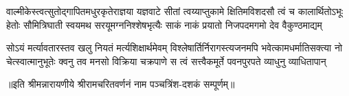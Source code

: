 \fourlineindentedshloka
{वाल्मीकेस्त्वत्सुतोद्गापितमधुरकृतेराज्ञया यज्ञवाटे}
{सीतां त्वय्याप्तुकामे क्षितिमविशदसौ त्वं च कालार्थितोऽभूः}
{हेतोः सौमित्रिघाती स्वयमथ सरयूमग्ननिश्शेषभृत्यैः}
{साकं नाकं प्रयातो निजपदमगमो देव वैकुण्ठमाद्यम्} %

\fourlineindentedshloka
{सोऽयं मर्त्यावतारस्तव खलु नियतं मर्त्यशिक्षार्थमेवम्}
{विश्लेषार्तिर्निरागस्त्यजनमपि भवेत्कामधर्मातिसक्त्या}
{नो चेत्स्वात्मानुभूतेः क्वनु तव मनसो विक्रिया चक्रपाणे}
{स त्वं सत्त्वैकमूर्ते पवनपुरपते व्याधुनु व्याधितापान्} %

॥इति श्रीमन्नारायणीये श्रीरामचरितवर्णनं नाम पञ्चत्रिंश-दशकं सम्पूर्णम्॥

\closesection